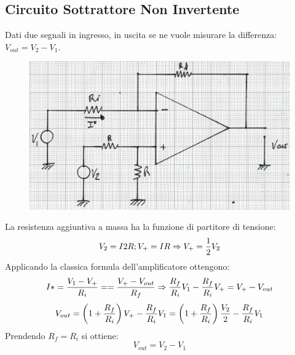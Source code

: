 \documentclass[a4paper, 15pt]{article}
\begin{document}
\subsection{Circuito Sottrattore Non Invertente}
\begin{adjustwidth}{2in}{}   
   		Dati due segnali in ingresso, in uscita se ne vuole misurare la differenza: $V_{out} = V_2 - V_1$.    		
\begin{figure}[H]
	\centering
	\includegraphics[width=0.5\linewidth]{immagini/mm(18)}
	\label{fig:mm18}
\end{figure}   		
   		La resistenza aggiuntiva a massa ha la funzione di partitore di tensione:
   		\[V_2 = I2R; V_+ = IR \Rightarrow V_+ = {1\over2}V_2\]
   		Applicando la classica formula dell'amplificatore ottengono:
   		\[I* = {V_1-V_+\over R_i}= = {V_+-V_{out}\over R_f}\Rightarrow{R_f\over R_i}V_1 - {R_f\over R_i}V_+ = V_+ - V_{out} \]
   		\[V_{out} = \left(1+{R_f\over R_i}\right)V_+ - {R_f\over R_i}V_1 = \left(1+{R_f\over R_i}\right){V_2\over2}- {R_f\over R_i}V_1 \]
   		Prendendo $R_f = R_i$ si ottiene:
   		\[V_{out} = V_2 - V_1\]
\end{adjustwidth}
\end{document}

